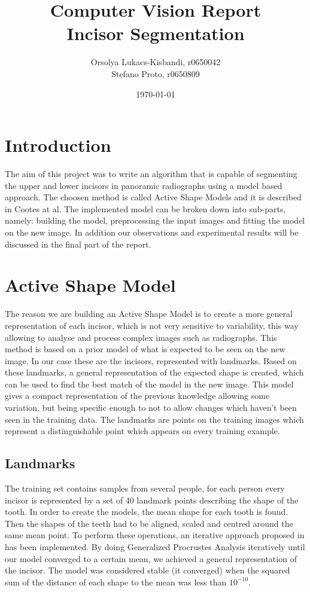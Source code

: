 \documentclass[a4paper]{article}
\author{Orsolya Lukacs-Kisbandi, r0650042 \\
		Stefano Proto, r0650809}
\title{ \textbf{Computer Vision Report \\ 
		Incisor Segmentation} }
\date{\today}
\begin{document}
\maketitle
\newpage
\setcounter{page}{1}
\tableofcontents


\section{Introduction}

The aim of this project was to write  an  algorithm  that  is  capable  of  segmenting  the upper and lower incisors in panoramic radiographs  using  a  model  based  approach. The choosen method is called Active Shape Models and it is described in \cite{cootes1} Cootes at al. The implemented model can be broken down into sub-parts, namely: building the model, preprocessing the input images and fitting the model on the new image. In addition our observations and experimental results will be discussed in the final part of the report. 

\section{Active Shape Model}

The reason we are building an Active Shape Model is to create a more general representation of each incisor, which is not very sensitive to variability, this way allowing to analyse and process complex images such as radiographs. This method is based on a prior model of what is expected to be seen on the new image. In our case these are the incisors, represented with landmarks. Based on these landmarks, a general representation of the expected shape is created, which can be used to find the best match of the model in the new image. This model gives a compact representation of the previous knowledge allowing some variation, but being specific enough to not to allow changes which haven't been seen in the training data. The landmarks are points on the training images which represent a distinguishable point which appears on every training example.

\subsection{Landmarks} %
The training set contains samples from several people, for each person every incisor is represented by a set of 40 landmark points describing the shape of the tooth. In order to create the models, the mean shape for each tooth is found. Then the shapes of the teeth had to be aligned, scaled and centred around the same mean point. To perform these operations, an iterative approach proposed in \cite{cootes1} has been implemented. By doing Generalized Procrustes Analysis iteratively until our model converged to a certain mean, we achieved a general representation of the incisor. The model was considered stable (it converged) when the squared sum of the distance of each shape to the mean was less than $10^{-10}$.
\end{document}

